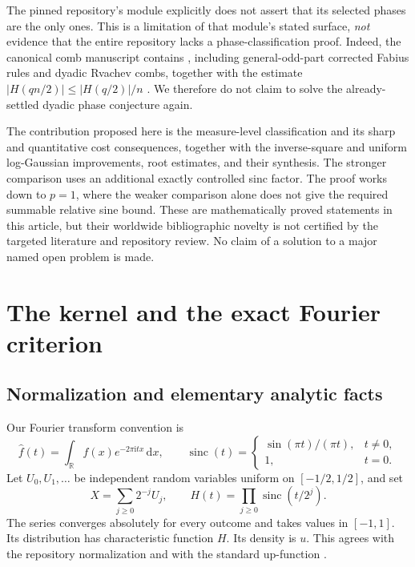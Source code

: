\documentclass[11pt,a4paper]{article}
\numberwithin{equation}{section}
\theoremstyle{definition}
\theoremstyle{remark}
\newcommand{\R}{\mathbb R}\newcommand{\Z}{\mathbb Z}\newcommand{\N}{\mathbb N}
\newcommand{\dd}{\,\mathrm d}\newcommand{\ii}{\mathrm i}
\newcommand{\sinc}{\operatorname{sinc}}
\begin{document}
The pinned repository's module
 explicitly does not assert that its
selected phases are the only ones. This is a limitation of that module's
stated surface, \emph{not} evidence that the entire repository lacks a
phase-classification proof. Indeed, the canonical comb manuscript contains
, including general-odd-part corrected Fabius rules
and dyadic Rvachev combs, together with the estimate
$|H(qn/2)|\le |H(q/2)|/n$ \cite{repoComb}. We therefore do not claim to
solve the already-settled dyadic phase conjecture again.

The contribution proposed here is the measure-level classification and its
sharp and quantitative cost consequences, together with the inverse-square
and uniform log-Gaussian improvements, root estimates, and their synthesis. The stronger
comparison uses an additional exactly controlled sinc factor. The proof
works down to $p=1$, where the weaker comparison alone does not give the
required summable relative sine bound. These are mathematically proved
statements in this article, but their worldwide bibliographic novelty is not
certified by the targeted literature and repository review. No claim of a
solution to a major named open problem is made.

\section{The kernel and the exact Fourier criterion}

\subsection{Normalization and elementary analytic facts}

Our Fourier transform convention is
\begin{equation}
 \widehat f(t)=\int_\R f(x)e^{-2\pi\ii tx}\dd x,
 \qquad
 \sinc(t)=\begin{cases}\sin(\pi t)/(\pi t),&t\ne0,\\1,&t=0.\end{cases}
 \label{eq:fourier-convention}
\end{equation}
Let $U_0,U_1,\ldots$ be independent random variables uniform on
$[-1/2,1/2]$, and set
\begin{equation}
 X=\sum_{j\ge0}2^{-j}U_j,
 \qquad
 H(t)=\prod_{j\ge0}\sinc(t/2^j).
 \label{eq:product}
\end{equation}
The series converges absolutely for every outcome and takes values in
$[-1,1]$. Its distribution has characteristic function $H$. Its density is
$u$. This agrees with the repository normalization and with the standard
up-function \cite{arias,repoComb}.
\end{document}
